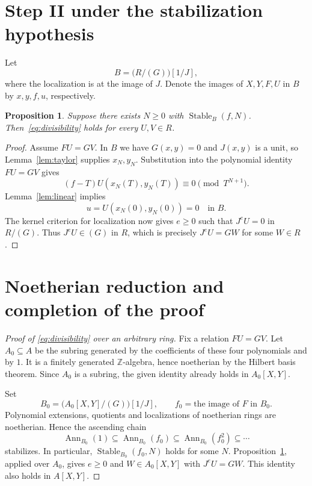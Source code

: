 \documentclass[11pt]{amsart}
\newtheorem{proposition}[theorem]{Proposition}
\theoremstyle{definition}
\theoremstyle{remark}
\DeclareMathOperator{\Ann}{Ann}
\begin{document}
\section{Step II under the stabilization hypothesis}\label{sec:conditional}

Let
\[
 B=\bigl(R/(G)\bigr)[1/J],
\]
where the localization is at the image of $J$. Denote the images of
$X,Y,F,U$ in $B$ by $x,y,f,u$, respectively.

\begin{proposition}\label{prop:conditional}
Suppose there exists $N\geq0$ with
$\operatorname{Stable}_B(f,N)$. Then~\eqref{eq:divisibility} holds
for every $U,V\in R$.
\end{proposition}
\begin{proof}
Assume $FU=GV$. In $B$ we have $G(x,y)=0$ and $J(x,y)$ is a unit,
so Lemma~\ref{lem:taylor} supplies $x_N,y_N$.
Substitution into the polynomial identity $FU=GV$ gives
\[
 (f-T)U(x_N(T),y_N(T))\equiv0\pmod {T^{N+1}}.
\]
Lemma~\ref{lem:linear} implies
\[
 u=U(x_N(0),y_N(0))=0\quad\text{in }B.
\]
The kernel criterion for localization now gives $e\geq0$ such that
$J^eU=0$ in $R/(G)$. Thus $J^eU\in(G)$ in $R$, which is precisely
$J^eU=GW$ for some $W\in R$.
\end{proof}

\section{Noetherian reduction and completion of the proof}\label{sec:noetherian}

\begin{proof}[Proof of \eqref{eq:divisibility} over an arbitrary ring]
Fix a relation $FU=GV$. Let $A_0\subseteq A$ be the subring generated
by the coefficients of these four polynomials and by $1$.
It is a finitely generated $\mathbb Z$-algebra, hence noetherian by
the Hilbert basis theorem. Since $A_0$ is a subring, the given
identity already holds in $A_0[X,Y]$.

Set
\[
 B_0=\bigl(A_0[X,Y]/(G)\bigr)[1/J],
 \qquad f_0=\text{the image of }F\text{ in }B_0.
\]
Polynomial extensions, quotients and localizations of noetherian rings
are noetherian. Hence the ascending chain
\[
 \Ann_{B_0}(1)\subseteq\Ann_{B_0}(f_0)
 \subseteq\Ann_{B_0}(f_0^2)\subseteq\cdots
\]
stabilizes. In particular, $\operatorname{Stable}_{B_0}(f_0,N)$ holds
for some $N$. Proposition~\ref{prop:conditional}, applied over $A_0$,
gives $e\geq0$ and $W\in A_0[X,Y]$ with $J^eU=GW$.
This identity also holds in $A[X,Y]$.
\end{proof}
\end{document}
